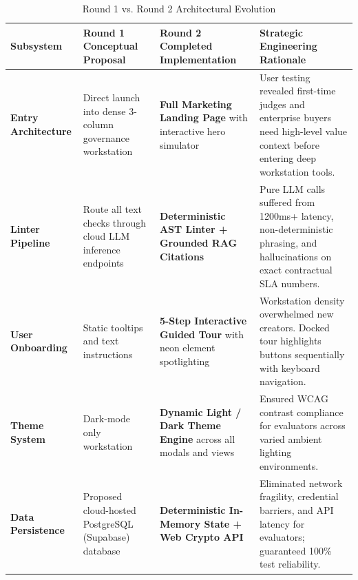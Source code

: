 \documentclass[10pt,a4paper]{article}
\begin{document}
\begin{table}[h]
\centering
\footnotesize
\caption{Round 1 vs. Round 2 Architectural Evolution}\label{tab:changes}
\begin{tabularx}{\textwidth}{p{2.8cm}p{3.8cm}p{4.0cm}X}
\toprule
\textbf{Subsystem} & \textbf{Round 1 Conceptual Proposal} & \textbf{Round 2 Completed Implementation} & \textbf{Strategic Engineering Rationale} \\
\midrule
\textbf{Entry Architecture} & Direct launch into dense 3-column governance workstation & \textbf{Full Marketing Landing Page} with interactive hero simulator & User testing revealed first-time judges and enterprise buyers need high-level value context before entering deep workstation tools. \\
\addlinespace[0.1cm]
\textbf{Linter Pipeline} & Route all text checks through cloud LLM inference endpoints & \textbf{Deterministic AST Linter + Grounded RAG Citations} & Pure LLM calls suffered from 1200ms+ latency, non-deterministic phrasing, and hallucinations on exact contractual SLA numbers. \\
\addlinespace[0.1cm]
\textbf{User Onboarding} & Static tooltips and text instructions & \textbf{5-Step Interactive Guided Tour} with neon element spotlighting & Workstation density overwhelmed new creators. Docked tour highlights buttons sequentially with keyboard navigation. \\
\addlinespace[0.1cm]
\textbf{Theme System} & Dark-mode only workstation & \textbf{Dynamic Light / Dark Theme Engine} across all modals and views & Ensured WCAG contrast compliance for evaluators across varied ambient lighting environments. \\
\addlinespace[0.1cm]
\textbf{Data Persistence} & Proposed cloud-hosted PostgreSQL (Supabase) database & \textbf{Deterministic In-Memory State + Web Crypto API} & Eliminated network fragility, credential barriers, and API latency for evaluators; guaranteed 100\% test reliability. \\
\bottomrule
\end{tabularx}
\end{table}

\vspace{-0.25cm}
\end{document}
